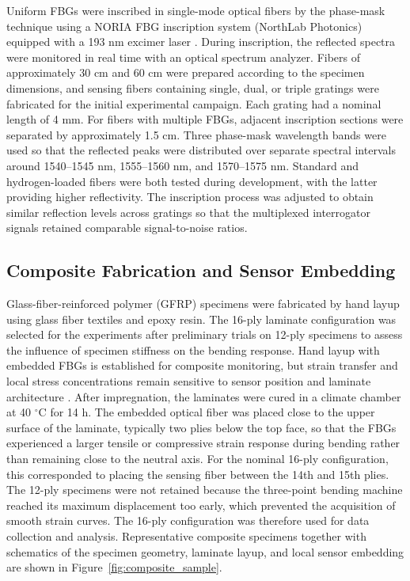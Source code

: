 \documentclass[notspecified,article,submit,pdftex,moreauthors]{Definitions/mdpi}
\begin{document}
Uniform FBGs were inscribed in single-mode optical fibers by the phase-mask technique using a NORIA FBG inscription system (NorthLab Photonics) equipped with a 193 nm excimer laser \cite{nieuwland2016}. During inscription, the reflected spectra were monitored in real time with an optical spectrum analyzer. Fibers of approximately 30 cm and 60 cm were prepared according to the specimen dimensions, and sensing fibers containing single, dual, or triple gratings were fabricated for the initial experimental campaign. Each grating had a nominal length of 4 mm. For fibers with multiple FBGs, adjacent inscription sections were separated by approximately 1.5 cm. Three phase-mask wavelength bands were used so that the reflected peaks were distributed over separate spectral intervals around 1540--1545 nm, 1555--1560 nm, and 1570--1575 nm. Standard and hydrogen-loaded fibers were both tested during development, with the latter providing higher reflectivity. The inscription process was adjusted to obtain similar reflection levels across gratings so that the multiplexed interrogator signals retained comparable signal-to-noise ratios.

\subsection{Composite Fabrication and Sensor Embedding}

Glass-fiber-reinforced polymer (GFRP) specimens were fabricated by hand layup using glass fiber textiles and epoxy resin. The 16-ply laminate configuration was selected for the experiments after preliminary trials on 12-ply specimens to assess the influence of specimen stiffness on the bending response. Hand layup with embedded FBGs is established for composite monitoring, but strain transfer and local stress concentrations remain sensitive to sensor position and laminate architecture \cite{kuang2001,luyckx2011,kinet2014}. After impregnation, the laminates were cured in a climate chamber at 40 $^\circ$C for 14 h. The embedded optical fiber was placed close to the upper surface of the laminate, typically two plies below the top face, so that the FBGs experienced a larger tensile or compressive strain response during bending rather than remaining close to the neutral axis. For the nominal 16-ply configuration, this corresponded to placing the sensing fiber between the 14th and 15th plies. The 12-ply specimens were not retained because the three-point bending machine reached its maximum displacement too early, which prevented the acquisition of smooth strain curves. The 16-ply configuration was therefore used for data collection and analysis. Representative composite specimens together with schematics of the specimen geometry, laminate layup, and local sensor embedding are shown in Figure~\ref{fig:composite_sample}.
\end{document}
